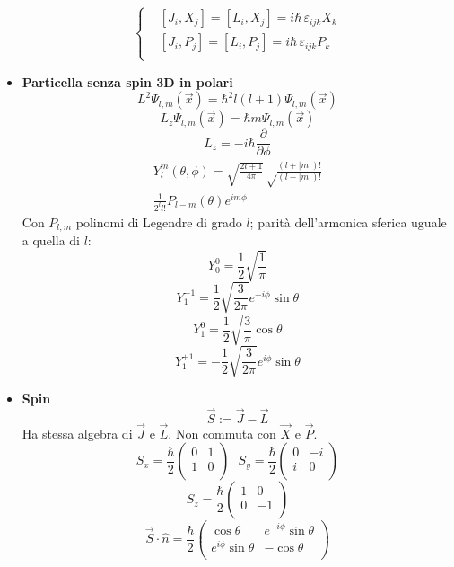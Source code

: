 \documentclass{article}
\begin{document}
\begin{footnotesize}
\begin{multicols*}{3}
\begin{itemize}[leftmargin=*]
		\[
			\left\{\begin{aligned}
				&\left[J_i, X_j\right] = \left[L_i,X_j\right] = i\hbar \,\varepsilon _{ijk} X_k\\
				&\left[J_i, P_j\right] = \left[L_i,P_j\right] = i\hbar \,\varepsilon _{ijk} P_k\\
			\end{aligned}\right.
		\]
	\item \textbf{Particella senza spin 3D in polari}
		\[L^2 \Psi _{l,m}(\vec{x}) = \hbar ^2 l(l+1) \Psi _{l,m}(\vec{x})\]
		\[L_z \Psi _{l,m}(\vec{x}) = \hbar m \Psi _{l,m}(\vec{x})\]
		\[L_z = -i\hbar \frac{\partial}{\partial \phi }\]
		\begin{align*}Y_l^m(\theta ,\phi ) = \sqrt{\frac{2l+1}{4\pi }}\sqrt\frac{(l+|m|)!}{\left(l-|m|\right)!}\\\frac{1}{2^ll!}P_{l-m}(\theta ) e^{im\phi }\end{align*}
		Con $P_{l,m}$ polinomi di Legendre di grado $l$; parità dell'armonica sferica uguale a quella di $l$:
		\[Y_0^0 = \frac{1}{2}\sqrt{\frac{1}{\pi }}\]
		\[Y_1^{-1} = \frac{1}{2}\sqrt{\frac{3}{2\pi }}e^{-i\phi }\sin\theta \]
		\[Y_1^0 = \frac{1}{2}\sqrt{\frac{3}{\pi }}\cos\theta \]
		\[Y_1^{+1} = -\frac{1}{2}\sqrt{\frac{3}{2\pi }} e^{i\phi }\sin\theta \]
	\item \textbf{Spin}
		\[\vec{S} := \vec{J}-\vec{L}\]
		Ha stessa algebra di $\vec{J}$ e $\vec{L}$. Non commuta con $\vec{X}$ e $\vec{P}$.
		\[S_x = \frac{\hbar }{2}
			\begin{pmatrix}
				0&1\\
				1&0\\
			\end{pmatrix}
			\hspace{8pt}
		S_y = \frac{\hbar }{2}
			\begin{pmatrix}
				0&-i\\
				i&0\\
			\end{pmatrix}
		\]
		\[S_z = \frac{\hbar }{2}
			\begin{pmatrix}
				1&0\\
				0&-1\\
			\end{pmatrix}
		\]
		\[\vec{S}\cdot \hat{n} = \frac{\hbar }{2} \begin{pmatrix}
			\cos\theta & e^{-i\phi }\sin\theta \\
			e^{i\phi }\sin\theta & -\cos\theta \\
		\end{pmatrix}\]

\end{itemize}
\end{multicols*}
\end{footnotesize}
\end{document}
